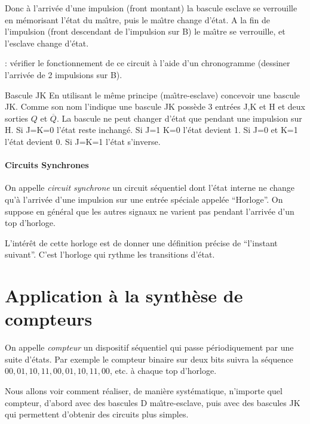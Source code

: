 Donc \`a l'arriv\'ee d'une impulsion (front montant) la bascule esclave 
se verrouille en m\'emorisant l'\'etat du ma\^{\i}tre, puis le ma\^{\i}tre change d'\'etat.
A la fin de l'impulsion (front descendant de l'impulsion sur B)
le ma\^{\i}tre se verrouille, et l'esclave change d'\'etat.

\begin{exercice}{}: v\'erifier le fonctionnement de ce circuit \`a l'aide d'un chronogramme
(dessiner l'arriv\'ee de 2 impulsions sur B).
\end{exercice}

\begin{probleme}{Bascule JK} En utilisant le m\^eme principe (ma\^{\i}tre-esclave) 
concevoir une bascule JK. Comme son nom l'indique une bascule JK poss\`ede 
3 entr\'ees J,K et H et deux sorties $Q$ et $\overline{Q}$.
La bascule ne peut changer d'\'etat que pendant une impulsion sur H.
Si J=K=0 l'\'etat reste inchang\'e. Si J=1 K=0 l'\'etat devient 1.
Si J=0 et K=1 l'\'etat devient 0. Si J=K=1 l'\'etat s'inverse.
\end{probleme}


\paragraph{Circuits Synchrones}
On appelle {\em circuit synchrone} un circuit s\'equentiel dont
l'\'etat interne ne change qu'\`a l'arriv\'ee d'une impulsion sur une
entr\'ee sp\'eciale appel\'ee ``Horloge''.  On suppose en g\'en\'eral
que les autres signaux ne varient pas pendant l'arriv\'ee d'un top
d'horloge.

L'int\'er\^et de cette horloge est de donner une d\'efinition pr\'ecise de
``l'instant suivant''. C'est l'horloge qui rythme les transitions d'\'etat.


\section{Application \`a la synth\`ese de compteurs}

On appelle {\em compteur} un dispositif séquentiel qui passe
p\'eriodiquement par une suite d'\'etats. Par exemple le compteur
binaire sur deux bits suivra la s\'equence $00, 01, 10 , 11, 00, 01,
10, 11, 00$, etc. \`a chaque top d'horloge.

Nous allons voir comment r\'ealiser, de mani\`ere syst\'ematique, n'importe
quel compteur, d'abord avec des bascules D ma\^{\i}tre-esclave, puis avec des 
bascules JK qui permettent d'obtenir des circuits plus simples.


